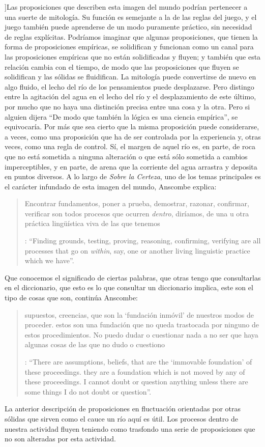 ]{Las proposiciones que describen esta imagen del mundo podrían pertenecer a una suerte de mitología. Su función es semejante a la de las reglas del juego, y el juego también puede aprenderse de un modo puramente práctico, sin necesidad de reglas explícitas. Podríamos imaginar que algunas proposiciones, que tienen la forma de proposiciones empíricas, se solidifican y funcionan como un canal para las proposiciones empíricas que no están solidificadas y fluyen; y también que esta relación cambia con el tiempo, de modo que las proposiciones que fluyen se solidifican y las sólidas se fluidifican. La mitología puede convertirse de nuevo en algo fluido, el lecho del río de los pensamientos puede desplazarse. Pero distingo entre la agitación del agua en el lecho del río y el desplazamiento de este último, por mucho que no haya una distinción precisa entre una cosa y la otra. Pero si alguien dijera ``De modo que también la lógica es una ciencia empírica'', se equivocaría. Por más que sea cierto que la misma proposición puede considerarse, a veces, como una proposición que ha de ser controlada por la experiencia y, otras veces, como una regla de control. Sí, el margen de aquel río es, en parte, de roca que no está sometida a ninguna alteración o que está sólo sometida a cambios imperceptibles, y en parte, de arena que la corriente del agua arrastra y deposita en puntos diversos}.
A lo largo de \emph{Sobre la Certeza}, uno de los temas principales es el carácter infundado de esta imagen del mundo, Anscombe explica: \blockquote[{\Cite[130]{anscombe1981parmenides:qli}}: \enquote{Finding grounds, testing, proving, reasoning, confirming, verifying are all processes that go on \emph{within}, say, one or another living linguistic practice which we have}.]{Encontrar fundamentos, poner a prueba, demostrar, razonar, confirmar, verificar son todos procesos que ocurren \emph{dentro}, diríamos, de una u otra práctica lingüística viva de las que tenemos}. Que conocemos el significado de ciertas palabras, que otras tengo que consultarlas en el diccionario, que esto es lo que consultar un diccionario implica, este son el tipo de cosas que son, continúa Anscombe: \blockquote[{\Cite[130]{anscombe1981parmenides:qli}}: \enquote{There are assumptions, beliefs, that are the `immovable foundation' of these proceedings. \textelp{} they are a foundation which is not moved by any of these proceedings. I cannot doubt or question anything unless there are some things I do not doubt or question}.]{supuestos, creencias, que son la `fundación inmóvil' de nuestros modos de proceder. \textelp{} estos son una fundación que no queda trastocada por ninguno de estos procedimientos. No puedo dudar o cuestionar nada a no ser que haya algunas cosas de las que no dudo o cuestiono}. La anterior descripción de proposiciones en fluctuación orientadas por otras sólidas que sirven como el cauce un río aquí es útil. Los procesos dentro de nuestra actividad fluyen teniendo como trasfondo una serie de proposiciones que no son alteradas por esta actividad.

